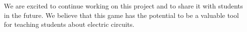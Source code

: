 \documentclass[twoside,a4paper,11pt]{article}
\begin{document}
\begin{multicols}{2}
 We are excited to continue working on this project and to share it with students in the future. We believe that this game has the potential to be a valuable tool for teaching students about electric circuits.
 
\printbibliography
\end{multicols}
\end{document}
